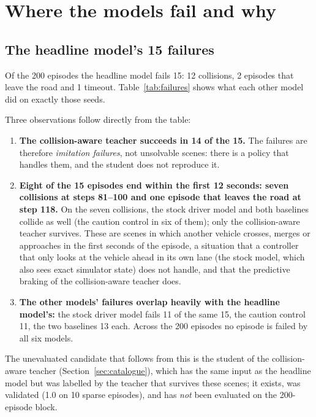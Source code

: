 \section{Where the models fail and why}\label{sec:failure}

\subsection{The headline model's 15 failures}
Of the 200 episodes the headline model fails 15: 12 collisions, 2 episodes that leave the road and 1 timeout. Table~\ref{tab:failures} shows what each other model did on exactly those seeds.
\begin{table}[H]\centering\small
\caption{The 15 episodes (of 200, clear weather, sparse traffic) that the headline model fails, and the outcome of the other five models on the same seeds. The number in brackets is the step (10 per second) at which the headline model's episode ended.}\label{tab:failures}
\resizebox{\textwidth}{!}{}
\end{table}
Three observations follow directly from the table:
\begin{enumerate}
\item \textbf{The collision-aware teacher succeeds in 14 of the 15.} The failures are therefore \emph{imitation failures}, not unsolvable scenes: there is a policy that handles them, and the student does not reproduce it.
\item \textbf{Eight of the 15 episodes end within the first 12 seconds: seven collisions at steps 81--100 and one episode that leaves the road at step 118.} On the seven collisions, the stock driver model and both baselines collide as well (the caution control in six of them); only the collision-aware teacher survives. These are scenes in which another vehicle crosses, merges or approaches in the first seconds of the episode, a situation that a controller that only looks at the vehicle ahead in its own lane
  (the stock model, which also sees exact simulator state) does not handle, and that the predictive braking of the collision-aware teacher does.
\item \textbf{The other models' failures overlap heavily with the headline model's:} the stock driver model fails 11 of the same 15, the caution control 11, the two baselines 13 each. Across the 200 episodes no episode is failed by all six models.
\end{enumerate}
The unevaluated candidate that follows from this is the student of the collision-aware teacher (Section~\ref{sec:catalogue}), which has the same input as the headline model but was labelled by the teacher that survives these scenes; it exists, was validated (1.0 on 10 sparse episodes), and has \emph{not} been evaluated on the 200-episode block.

